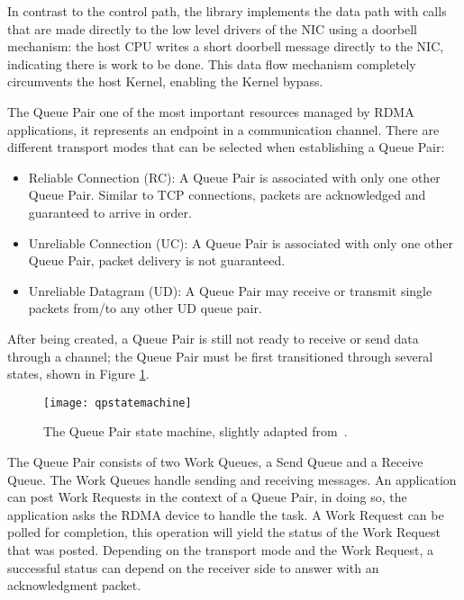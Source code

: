 In contrast to the control path,  the library implements the data path with calls that are made
directly to the low level drivers of the NIC using a doorbell mechanism: the host CPU %
writes a short doorbell message directly to the
NIC, indicating there is work to be done\cite{kaliaUsingRDMAEfficiently2014}. This data flow mechanism completely circumvents the
host Kernel, enabling the Kernel bypass\cite{kaliaDesignGuidelinesHigh2016}.

The Queue Pair one of the most important resources managed by RDMA applications, it represents an endpoint
in a communication channel. There are different transport modes that can be selected when establishing a Queue Pair\cite{rdmamanual}:

\begin{itemize}
  \item Reliable Connection (RC): A Queue Pair is associated with only one other Queue Pair. Similar to TCP connections, packets are acknowledged and guaranteed to arrive in order.
  \item Unreliable Connection (UC): A Queue Pair is associated with only one other Queue Pair, packet delivery is not guaranteed.
  \item Unreliable Datagram (UD): A Queue Pair may receive or transmit single packets from/to any other UD queue pair.
\end{itemize}

After being created, a Queue Pair is still not ready to receive or send data through a channel; the Queue Pair must be first
transitioned through several states, shown in Figure \ref{fig:qpstatemachine}.

\begin{figure}[h!]
  \centering
  \texttt{[image: qpstatemachine]}
  \caption[Queue Pair state machine]{The Queue Pair state machine, slightly adapted from~\cite{QPStateMachine2012}.}
  \label{fig:qpstatemachine}
\end{figure}

The Queue Pair consists of two Work Queues, a Send Queue and a Receive
Queue. The Work Queues handle sending and receiving messages.
An application can post Work Requests in the context of a Queue Pair, in
doing so, the application asks the RDMA device to handle the task.
A Work Request can be polled for completion, this operation will yield
the status of the Work Request that was posted. Depending on the transport
mode and the Work Request, a successful status can depend on the receiver
side to answer with an acknowledgment packet.

